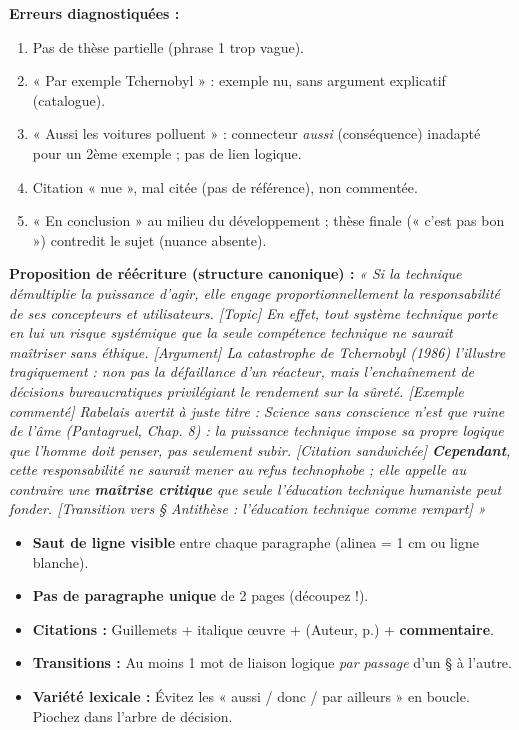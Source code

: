 \documentclass[11pt]{article}
\begin{document}
\begin{corrige}
\textbf{Erreurs diagnostiquées :}
\begin{enumerate}
    \item Pas de thèse partielle (phrase 1 trop vague).
    \item « Par exemple Tchernobyl » : exemple nu, sans argument explicatif (catalogue).
    \item « Aussi les voitures polluent » : connecteur \emph{aussi} (conséquence) inadapté pour un 2ème exemple ; pas de lien logique.
    \item Citation « nue », mal citée (pas de référence), non commentée.
    \item « En conclusion » au milieu du développement ; thèse finale (« c'est pas bon ») contredit le sujet (nuance absente).
\end{enumerate}

\textbf{Proposition de réécriture (structure canonique) :}
\emph{« Si la technique démultiplie la puissance d'agir, elle engage proportionnellement la responsabilité de ses concepteurs et utilisateurs. [Topic] En effet, tout système technique porte en lui un risque systémique que la seule compétence technique ne saurait maîtriser sans éthique. [Argument] La catastrophe de Tchernobyl (1986) l'illustre tragiquement : non pas la défaillance d'un réacteur, mais l'enchaînement de décisions bureaucratiques privilégiant le rendement sur la sûreté. [Exemple commenté] Rabelais avertit à juste titre : \og Science sans conscience n'est que ruine de l'âme \fg{} (\emph{Pantagruel}, Chap. 8) : la puissance technique impose sa propre logique que l'homme doit penser, pas seulement subir. [Citation sandwichée] \textbf{Cependant}, cette responsabilité ne saurait mener au refus technophobe ; elle appelle au contraire une \textbf{maîtrise critique} que seule l'éducation technique humaniste peut fonder. [Transition vers § Antithèse : l'éducation technique comme rempart] »}
\end{corrige}

\begin{attention}
\begin{itemize}
    \item [$\square$] \textbf{Saut de ligne visible} entre chaque paragraphe (alinea = 1 cm ou ligne blanche).
    \item [$\square$] \textbf{Pas de paragraphe unique} de 2 pages (découpez !).
    \item [$\square$] \textbf{Citations :} Guillemets \og \fg{} + italique œuvre + (Auteur, p.) + \textbf{commentaire}.
    \item [$\square$] \textbf{Transitions :} Au moins 1 mot de liaison logique \emph{par passage} d'un § à l'autre.
    \item [$\square$] \textbf{Variété lexicale :} Évitez les « aussi / donc / par ailleurs » en boucle. Piochez dans l'arbre de décision.
\end{itemize}
\end{attention}
\end{document}
